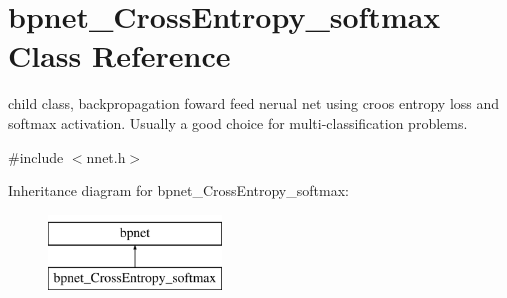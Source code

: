 \hypertarget{classbpnet__CrossEntropy__softmax}{\section{bpnet\-\_\-\-Cross\-Entropy\-\_\-softmax Class Reference}
\label{classbpnet__CrossEntropy__softmax}
}


child class, backpropagation foward feed nerual net using croos entropy loss and softmax activation. Usually a good choice for multi-\/classification problems.  




{\ttfamily \#include $<$nnet.\-h$>$}

Inheritance diagram for bpnet\-\_\-\-Cross\-Entropy\-\_\-softmax\-:\begin{figure}[H]
\begin{center}
\leavevmode
\includegraphics[height=2.000000cm]{classbpnet__CrossEntropy__softmax}
\end{center}
\end{figure}
